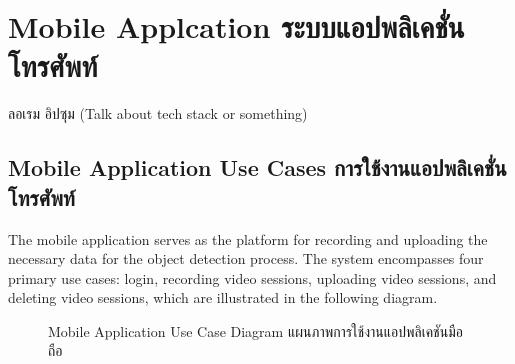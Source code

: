 \section{\ifenglish Mobile Applcation \else ระบบแอปพลิเคชั่นโทรศัพท์ \fi}
\ifenglish
\else
ลอเรม อิปซุม (Talk about tech stack or something)
    
\fi
\subsection{\ifenglish Mobile Application Use Cases \else การใช้งานแอปพลิเคชั่นโทรศัพท์ \fi}
The mobile application serves as the platform for recording and uploading the necessary data for the object detection process. The system encompasses four primary use cases: login, recording video sessions, uploading video sessions, and deleting video sessions, which are illustrated in the following diagram.

\begin{figure}[ht]
    \begin{center}
    
    \end{center}
    \newcommand{\MobileAppUseCaseDiagram}{\ifenglish Mobile Application Use Case Diagram \else แผนภาพการใช้งานแอปพลิเคชันมือถือ\fi}
    \caption[\MobileAppUseCaseDiagram]{\MobileAppUseCaseDiagram}
    \label{fig:mobile app use case diagram}
\end{figure}

